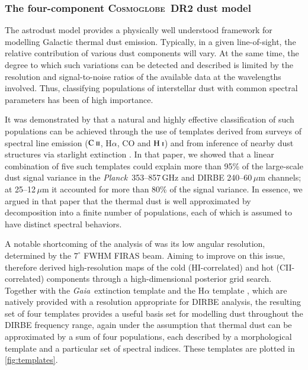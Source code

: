 \documentclass{aa}
\newcommand{\mathsc}[1]{{\normalfont\textsc{#1}}}
\def\Cosmoglobe{\textsc{Cosmoglobe}}
\def\Planck{\textit{Planck}}
\def\GAIA{\textit{Gaia}}
\newcommand{\CII}{\ensuremath{\mathsc{C\ ii}}}
\newcommand{\HI}{\ensuremath{\mathsc{H\ i}}}
\begin{document}
{\subsubsection{The four-component \Cosmoglobe\ DR2 dust model}
\label{sec:fourcompmodel}
The astrodust model provides a physically well understood framework
for modelling Galactic thermal dust emission. Typically, in a given
line-of-sight, the relative contribution of various dust components
will vary. At the same time, the degree to which such variations can
be detected and described is limited by the resolution and
signal-to-noise ratios of the available data at the wavelengths
involved. Thus, classifying populations of interstellar dust with
common spectral parameters has been of high importance.

It was demonstrated by \citet{CG02_05} that a natural and highly
effective classification of such populations can be achieved through
the use of templates derived from surveys of spectral line emission
(\CII, H$\alpha$, CO and \HI) and from inference of nearby dust
structures via starlight extinction \citep{edenhofer:2024}. In that
paper, we showed that a linear combination of five such templates
could explain more than 95\% of the large-scale dust signal variance
in the \Planck\ 353--857\,GHz and DIRBE 240--60\,$\mu$m channels; at
25--12\,$\mu$m it accounted for more than 80\% of the signal variance. In
essence, we argued in that paper that the thermal dust is well approximated by
decomposition into a finite number of populations, each of which is assumed to
have distinct spectral behaviors.

A notable shortcoming of the analysis of \citet{CG02_05} was its low
angular resolution, determined by the $7^{\circ}$ FWHM FIRAS
beam. Aiming to improve on this issue, \citet{CG02_06} therefore
derived high-resolution maps of the cold (HI-correlated) and hot
(CII-correlated) components through a high-dimensional posterior grid
search. Together with the \GAIA\ extinction template
\citep{edenhofer:2024} and the H$\alpha$ template \textbf{\citep{2016WHAM}},
which are natively provided with a resolution appropriate for DIRBE
analysis, the resulting set of four templates provides a useful basis
set for modelling dust throughout the DIRBE frequency range, again under the
assumption that thermal dust can be approximated by a sum of four populations,
each described by a morphological template and a particular set of spectral
indices. These templates are plotted in \cref{fig:templates}.

}
\end{document}
